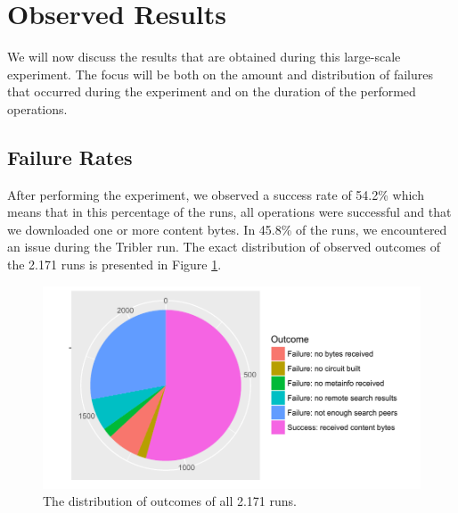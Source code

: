 \section{Observed Results}
We will now discuss the results that are obtained during this large-scale experiment. The focus will be both on the amount and distribution of failures that occurred during the experiment and on the duration of the performed operations.

\subsection{Failure Rates}
After performing the experiment, we observed a success rate of 54.2\% which means that in this percentage of the runs, all operations were successful and that we downloaded one or more content bytes. In 45.8\% of the runs, we encountered an issue during the Tribler run. The exact distribution of observed outcomes of the 2.171 runs is presented in Figure \ref{fig:big-experiment-outcome-pie}.

\begin{figure}[!h]
	\centering
	\includegraphics[width=0.7\columnwidth]{images/big_experiment/outcome_pie}
	\caption{The distribution of outcomes of all 2.171 runs.}
	\label{fig:big-experiment-outcome-pie}
\end{figure}

